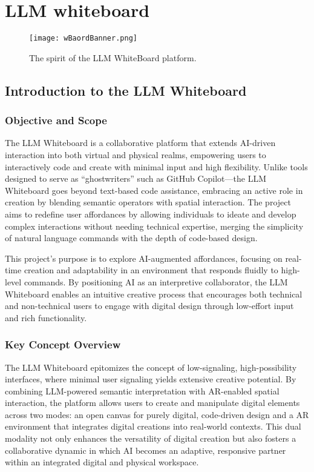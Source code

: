 \section{LLM whiteboard}

\begin{figure}[!h]
    \centering
    \texttt{[image: wBaordBanner.png]}
    \caption{The spirit of the LLM WhiteBoard platform.}
    \vspace{0.1cm}
    \label{fig:spiritofWB}
\end{figure}

\subsection{ Introduction to the LLM Whiteboard}

\subsubsection{Objective and Scope}

The LLM Whiteboard is a collaborative platform that extends AI-driven interaction into both virtual and physical realms, empowering users to interactively code and create with minimal input and high flexibility.
Unlike tools designed to serve as “ghostwriters” such as GitHub Copilot\cite{chen2021evaluating}\cite{dakhel2023github}—the LLM Whiteboard goes beyond text-based code assistance, embracing an active role in creation by blending semantic operators with spatial interaction.
The project aims to redefine user affordances by allowing individuals to ideate and develop complex interactions without needing technical expertise, merging the simplicity of natural language commands with the depth of code-based design.

This project’s purpose is to explore AI-augmented affordances, focusing on real-time creation and adaptability in an environment that responds fluidly to high-level commands.
By positioning AI as an interpretive collaborator, the LLM Whiteboard enables an intuitive creative process that encourages both technical and non-technical users to engage with digital design through low-effort input and rich functionality.

\subsubsection{Key Concept Overview}

The LLM Whiteboard epitomizes the concept of low-signaling, high-possibility interfaces, where minimal user signaling yields extensive creative potential.
By combining LLM-powered semantic interpretation with AR-enabled spatial interaction, the platform allows users to create and manipulate digital elements across two modes: an open canvas for purely digital, code-driven design and a AR environment that integrates digital creations into real-world contexts.
This dual modality not only enhances the versatility of digital creation but also fosters a collaborative dynamic in which AI becomes an adaptive, responsive partner within an integrated digital and physical workspace.

